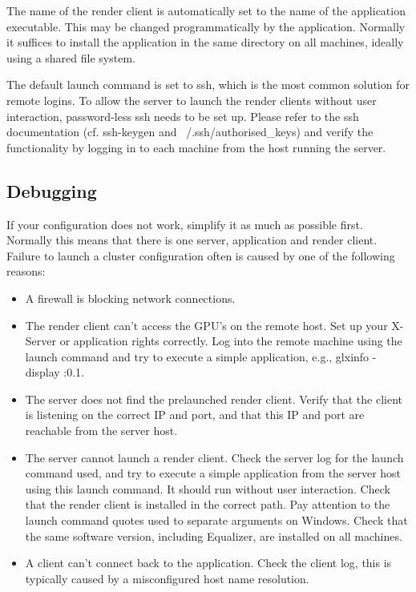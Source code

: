\documentclass[10pt,a4]{scrartcl}
\begin{document}
The name of the render client is automatically set to the name of the
application executable. This may be changed programmatically by the
application. Normally it suffices to install the application in the same
directory on all machines, ideally using a shared file system.

The default launch command is set to ssh, which is the most common solution for
remote logins. To allow the server to launch the render clients without user
interaction, password-less ssh needs to be set up. Please refer to the ssh
documentation (cf. \textsf{ssh-keygen} and \textsf{~/.ssh/authorised\_keys}) and
verify the functionality by logging in to each machine from the host running the
server.

\subsection{Debugging}
If your configuration does not work, simplify it as much as possible
first. Normally this means that there is one server, application and render
client. Failure to launch a cluster configuration often is caused by one of the
following reasons:
\begin{itemize}
\item A firewall is blocking network connections.
\item The render client can't access the GPU's on the remote host. Set up your
  X-Server or application rights correctly. Log into the remote machine using
  the launch command and try to execute a simple application, e.g.,
  \textsf{glxinfo -display :0.1}.
\item The server does not find the prelaunched render client. Verify that the
  client is listening on the correct IP and port, and that this IP and port are
  reachable from the server host.
\item The server cannot launch a render client. Check the server log for the
  launch command used, and try to execute a simple application from the server
  host using this launch command. It should run without user interaction. Check
  that the render client is installed in the correct path. Pay attention to the
  launch command quotes used to separate arguments on Windows. Check that the
  same software version, including Equalizer, are installed on all machines.
\item A client can't connect back to the application. Check the client log, this
  is typically caused by a misconfigured host name resolution.
\end{itemize}
\end{document}
